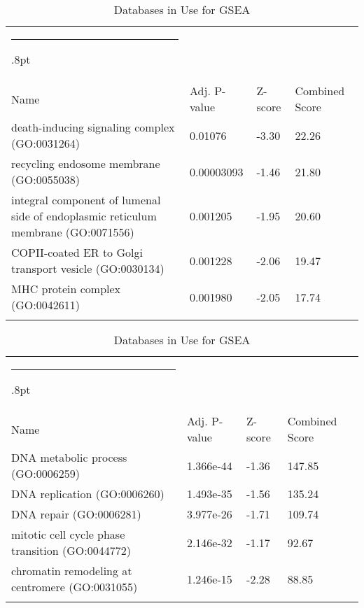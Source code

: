 \documentclass[3p,authoryear,preprint,12pt]{elsarticle}
\makeatletter
\def\hlinewd#1{%
  \noalign{\ifnum0=`}\fi\hrule \@height #1%
  \futurelet\reserved@a\@xhline}
\def\tbltoprule{\hlinewd{.8pt}\\[-12pt]}
\def\tblbottomrule{\noalign{\vspace*{6pt}}\hline\noalign{\vspace*{2pt}}}
\def\tblmidrule{\noalign{\vspace*{6pt}}\hline\noalign{\vspace*{2pt}}}
\makeatother
\begin{document}
\begin{table*}[!htbp]
	\caption{{Databases in Use for GSEA} }
	\label{tw-de478ae31cc6}
	\def\arraystretch{1}
	\ignorespaces 
	\centering 
	\begin{tabulary}{\linewidth}{p{\dimexpr.65\tabcolsep}p{\dimexpr.15\tabcolsep}p{\dimexpr.1\tabcolsep}p{\dimexpr.1\tabcolsep}}
		\tbltoprule Name & Adj. P-value & Z-score & Combined Score\\
		\tblmidrule
death-inducing signaling complex (GO:0031264) & 0.01076 & -3.30 & 22.26 \\
recycling endosome membrane (GO:0055038) & 0.00003093 & -1.46 & 21.80 \\
integral component of lumenal side of endoplasmic reticulum membrane (GO:0071556) & 0.001205 & -1.95 & 20.60 \\
COPII-coated ER to Golgi transport vesicle (GO:0030134) & 0.001228 & -2.06 & 19.47 \\
MHC protein complex (GO:0042611) & 0.001980 & -2.05 & 17.74 \\
		\tblbottomrule
	\end{tabulary}\par 
\end{table*}
\begin{table*}[!htbp]
	\caption{{Databases in Use for GSEA} }
	\label{tw-de478ae31cc6}
	\def\arraystretch{1}
	\ignorespaces 
	\centering 
	\begin{tabulary}{\linewidth}{p{\dimexpr.65\tabcolsep}p{\dimexpr.15\tabcolsep}p{\dimexpr.1\tabcolsep}p{\dimexpr.1\tabcolsep}}
		\tbltoprule Name & Adj. P-value & Z-score & Combined Score\\
		\tblmidrule
DNA metabolic process (GO:0006259) & 1.366e-44 & -1.36 & 147.85 \\
DNA replication (GO:0006260) & 1.493e-35 & -1.56 & 135.24 \\
DNA repair (GO:0006281) & 3.977e-26 & -1.71 & 109.74 \\
mitotic cell cycle phase transition (GO:0044772) & 2.146e-32 & -1.17 & 92.67 \\
chromatin remodeling at centromere (GO:0031055) & 1.246e-15 & -2.28 & 88.85 \\
		\tblbottomrule
	\end{tabulary}\par 
\end{table*}
\end{document}
